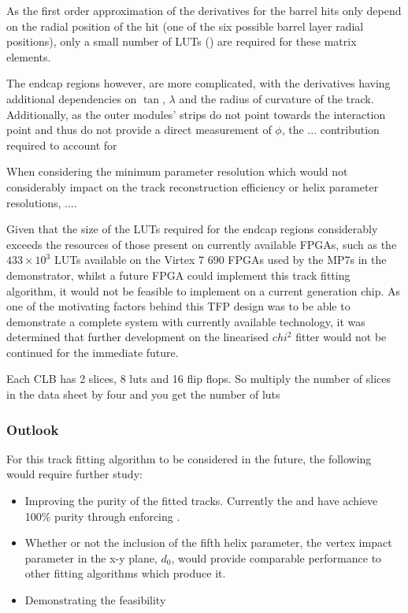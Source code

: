 As the first order approximation of the derivatives for the barrel hits only depend on the radial position of the hit (\ie one of the six possible barrel layer radial positions), only a small number of LUTs () are required for these matrix elements.

The endcap regions however, are more complicated, with the derivatives having additional dependencies on $\tan$, $\lambda$ and the radius of curvature of the track.
Additionally, as the outer modules' strips do not point towards the interaction point and thus do not provide a direct measurement of $\phi$,  the ... contribution required to account for 

 
When considering the minimum parameter resolution which would not considerably impact on the track reconstruction efficiency or helix parameter resolutions, .... 

Given that the size of the LUTs required for the endcap regions considerably exceeds the resources of those present on currently available FPGAs, such as the $433 \times 10^{3}$ LUTs available on the Virtex 7 690 FPGAs used by the MP7s in the demonstrator, whilst a future FPGA could implement this track fitting algorithm, it would not be feasible to implement on a current generation chip.
As one of the motivating factors behind this TFP design was to be able to demonstrate a complete system with currently available technology, it was determined that further development on the linearised $chi^{2}$ fitter would not be continued for the immediate future.




Each CLB has 2 slices, 8 luts and 16 flip flops. So multiply the number of slices in the data sheet by four and you get the number of luts

\subsubsection{Outlook}\label{subsubsec:chi2outlook}
For this track fitting algorithm to be considered in the future, the following would require further study:
\begin{itemize}
\item Improving the purity of the fitted tracks. Currently the \KF and \LR have achieve 100\% purity through enforcing 
.
\item Whether or not the inclusion of the fifth helix parameter, the vertex impact parameter in the x-y plane, $d_{0}$, would provide comparable performance to other fitting algorithms which produce it.
\item Demonstrating the feasibility 
\end{itemize}

